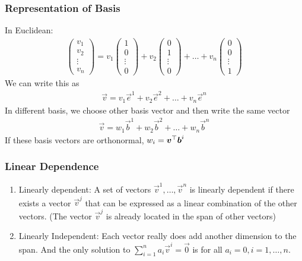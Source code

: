 \subsubsection*{Representation of Basis}

In Euclidean:
\begin{align*}
\begin{pmatrix}
v_1 \\ v_2 \\ \vdots \\ v_n
\end{pmatrix}=v_1\begin{pmatrix}
1 \\ 0 \\ \vdots \\ 0
\end{pmatrix}+v_2\begin{pmatrix}
0 \\ 1 \\ \vdots \\ 0
\end{pmatrix}+\dots+v_n\begin{pmatrix}
0 \\ 0 \\ \vdots \\ 1
\end{pmatrix}
\end{align*}
We can write this as
\begin{align*}
	\vec{v}=v_1\vec{e}^1+v_2\vec{e}^2+\dots+v_n\vec{e}^n
\end{align*}
In different basis, we choose other basis vector and then write the same vector
\begin{align*}
	\vec{v}=w_1\vec{b}^1+w_2\vec{b}^2+\dots+w_n\vec{b}^n
\end{align*}
If these basis vectors are orthonormal, $w_i=\boldsymbol{v}{}^\top\boldsymbol{b}^i$

\subsubsection*{Linear Dependence}

\begin{enumerate}
	\item Linearly dependent: A set of vectors $\vec{v}^1,\dotsc,\vec{v}^n$ is linearly dependent if there exists a vector $\vec{v}^j$ that can be expressed as a linear combination of the other vectors. (The vector $\vec{v}^j$ is already located in the span of other vectors)
	\item Linearly Independent: Each vector really does add another dimension to the span. And the only solution to $\sum_{i=1}^na_i\vec{v}^i=\vec{0}$ is for all $a_i=0, i=1,\dotsc,n$.
\end{enumerate}

